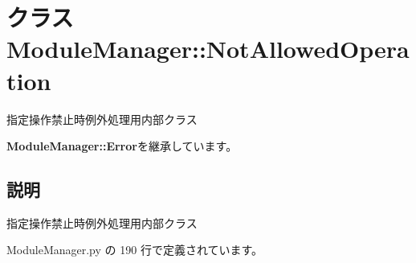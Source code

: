 \section{クラス ModuleManager::NotAllowedOperation}
\label{classsource__py_1_1_module_manager_1_1_module_manager_1_1_not_allowed_operation}
指定操作禁止時例外処理用内部クラス  


{\bf ModuleManager::Error}を継承しています。



\subsection{説明}
指定操作禁止時例外処理用内部クラス 

 ModuleManager.py の 190 行で定義されています。